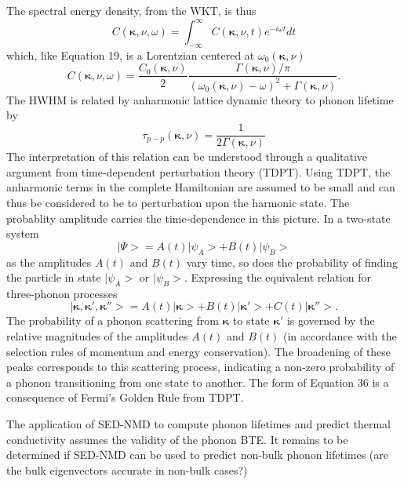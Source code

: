 The spectral energy density, from the WKT, is thus
\begin{equation}
C(\bm{\kappa},\nu,\omega)=\int_{-\infty}^{\infty}C(\bm{\kappa},\nu,t)e^{-i\omega t}dt
\end{equation}
which, like Equation 19, is a Lorentzian centered at $\omega_0(\bm{\kappa},\nu)$
\begin{equation}
C(\bm{\kappa},\nu,\omega)=\frac{C_0(\bm{\kappa},\nu)}{2}\frac{\Gamma(\bm{\kappa},\nu)/\pi}{(\omega_0(\bm{\kappa},\nu)-\omega)^2+\Gamma(\bm{\kappa},\nu)}.
\end{equation}
The HWHM is related by anharmonic lattice dynamic theory \cite{PhysRev.128.2589} to phonon lifetime by
\begin{equation}
\tau_{p-p}(\bm{\kappa}, \nu)=\frac{1}{2\Gamma(\bm{\kappa},\nu)}
\end{equation}
The interpretation of this relation can be understood through a qualitative argument from time-dependent perturbation theory (TDPT). Using TDPT, the anharmonic terms in the complete Hamiltonian are assumed to be small and can thus be considered to be to perturbation upon the harmonic state. The probablity amplitude carries the time-dependence in this picture. In a two-state system
\begin{equation}
|\Psi>=A(t)|\psi_A>+B(t)|\psi_B>
\end{equation}
as the amplitudes $A(t)$ and $B(t)$ vary time, so does the probability of finding the particle in state $|\psi_A>$ or $|\psi_B>$. Expressing the equivalent relation for three-phonon processes
\begin{equation}
|\bm{\kappa},\bm{\kappa}',\bm{\kappa}''>=A(t)|\bm{\kappa}>+B(t)|\bm{\kappa}'>+C(t)|\bm{\kappa}''>.
\end{equation}
The probability of a phonon scattering from $\bm{\kappa}$ to state $\bm{\kappa}'$ is governed by the relative magnitudes of the amplitudes $A(t)$ and $B(t)$ (in accordance with the selection rules of momentum and energy conservation). The broadening of these peaks corresponds to this scattering process, indicating a non-zero probability of a phonon transitioning from one state to another. The form of Equation 36 is a consequence of Fermi's Golden Rule from TDPT.

The application of SED-NMD to compute phonon lifetimes and predict thermal conductivity assumes the validity of the phonon BTE. It remains to be determined if SED-NMD can be used to predict non-bulk phonon lifetimes (are the bulk eigenvectors accurate in non-bulk cases?)



